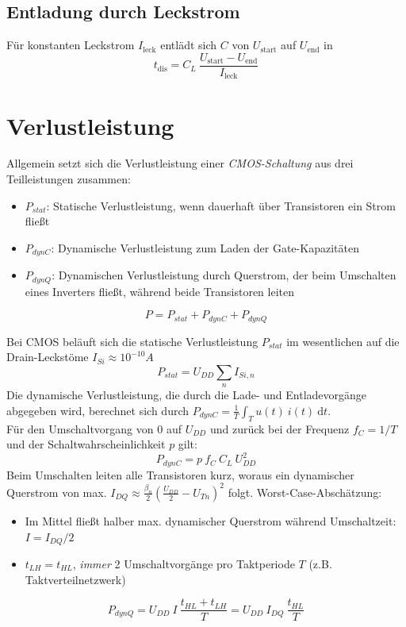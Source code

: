 \documentclass[a4paper,11pt]{article}
\begin{document}
\subsection*{Entladung durch Leckstrom}
Für konstanten Leckstrom $I_{\text{leck}}$ entlädt sich $C$ von $U_{\text{start}}$ auf $U_{\text{end}}$ in
\[
	\boxed { \quad t_{\text{dis}} = C_L ~ \frac{U_{\text{start}} - U_{\text{end}}}{I_{\text{leck}}} \quad }
\]

\newpage
\section*{Verlustleistung}
Allgemein setzt sich die Verlustleistung einer \textit{CMOS-Schaltung} aus drei Teilleistungen zusammen:
\begin{itemize}
\item $P_{stat}$: Statische Verlustleistung, wenn dauerhaft über Transistoren ein Strom fließt
\item $P_{dynC}$: Dynamische Verlustleistung zum Laden der Gate-Kapazitäten
\item $P_{dynQ}$: Dynamischen Verlustleistung durch Querstrom, der beim Umschalten eines Inverters fließt, während beide Transistoren leiten
\end{itemize}
\[ \boxed{P=P_{stat}+P_{dynC}+P_{dynQ}} \]

\raggedright
Bei CMOS beläuft sich die statische Verlustleistung $P_{stat}$ im wesentlichen auf die Drain-Leckstöme $I_{Si}\approx10^{-10}A$
\[ \boxed{P_{stat}=U_{DD}\sum_n I_{Si,n}} \]
Die dynamische Verlustleistung, die durch die Lade- und Entladevorgänge abgegeben wird, berechnet sich durch $P_{dynC}=\frac{1}{T}\displaystyle\int_T u(t) ~ i(t) ~ \mathrm{d}t$.\\
Für den Umschaltvorgang von $0$ auf $U_{DD}$ und zurück bei der Frequenz $f_C=1/T$ und der Schaltwahrscheinlichkeit $p$ gilt:
\[ \boxed{P_{dynC}=p\ f_C\ C_L \ U_{DD}^2} \]
Beim Umschalten leiten alle Transistoren kurz, woraus ein dynamischer Querstrom von max. $I_{DQ}\approx\frac{\beta_n}{2}\left(\frac{U_{DD}}{2}-U_{Tn}\right)^2$ folgt. Worst-Case-Abschätzung:
\begin{itemize}
\item Im Mittel fließt halber max. dynamischer Querstrom während Umschaltzeit: $I = I_{DQ} / 2$
\item $t_{LH} = t_{HL}$, \textit{immer} 2 Umschaltvorgänge pro Taktperiode $T$ (z.B. Taktverteilnetzwerk)
\end{itemize}
\[ P_{dynQ} = U_{DD} ~ I ~ \frac{t_{HL} + t_{LH}}{T} = U_{DD} ~ I_{DQ} ~ \frac{t_{HL}}{T} \] 
\end{document}
